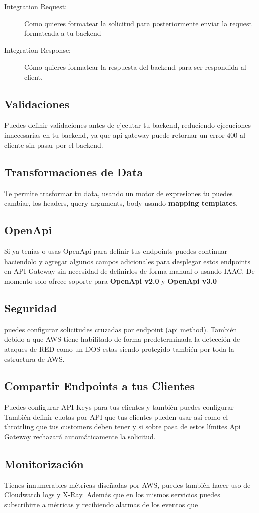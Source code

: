 \begin{description}
	\item[Integration Request:] Como quieres formatear la solicitud para posteriormente enviar la request formateada a tu backend
	\item[Integration Response:] Cómo quieres formatear la respuesta del backend para ser respondida al client.
\end{description}

\subsection{Validaciones}
Puedes definir validaciones antes de ejecutar tu backend, reduciendo ejecuciones innecesarias en tu backend, ya que api gateway puede retornar un error 400 al cliente sin pasar por el backend.

\subsection{Transformaciones de Data}
Te permite trasformar tu data, usando un motor de expresiones tu puedes cambiar, los headers, query arguments, body usando \textbf{mapping templates}.

\subsection{OpenApi}
Si ya tenías o usas OpenApi para definir tus endpoints puedes continuar haciendolo y agregar algunos campos adicionales para desplegar estos endpoints en API Gateway sin necesidad de definirlos de forma manual o usando IAAC.
De momento solo ofrece soporte para \textbf{OpenApi v2.0} y \textbf{OpenApi v3.0}
\subsection{Seguridad}
puedes configurar solicitudes cruzadas por endpoint (api method). También debido a que AWS tiene habilitado de forma predeterminada la detección de ataques de RED como un DOS estas siendo protegido también por toda la estructura de AWS.

\subsection{Compartir Endpoints a tus Clientes}
Puedes configurar API Keys para tus clientes y también puedes configurar También definir cuotas por API que tus clientes pueden usar así como el throttling que tus customers deben tener y si sobre pasa de estos límites Api Gateway rechazará automáticamente la solicitud.

\subsection{Monitorización}
Tienes innumerables métricas diseñadas por AWS, puedes también hacer uso de Cloudwatch logs y X-Ray. Además que en los mismos servicios puedes subscribirte a métricas y recibiendo alarmas de los eventos que 